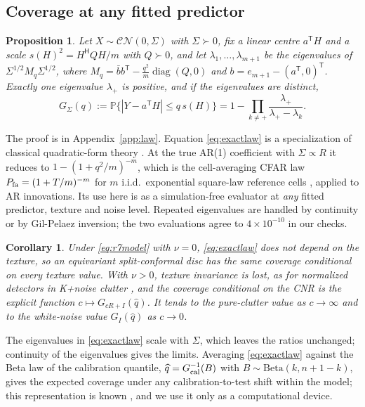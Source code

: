 \documentclass[journal]{IEEEtran}
\newtheorem{proposition}{Proposition}
\newtheorem{corollary}{Corollary}
\newcommand{\PP}{\mathbb{P}}
\begin{document}
\subsection{Coverage at any fitted predictor}
\begin{proposition}\label{prop:law}
Let $X\sim\mathcal{CN}(0,\Sigma)$ with $\Sigma\succ0$, fix a linear centre $a^{\mathsf T}H$ and a scale $s(H)^2=H^{\mathsf H}QH/m$ with $Q\succ0$, and let $\lambda_1,\dots,\lambda_{m+1}$ be the eigenvalues of $\Sigma^{1/2}M_q\Sigma^{1/2}$, where $M_q=\bar bb^{\mathsf T}-\frac{q^2}{m}\operatorname{diag}(Q,0)$ and $b=e_{m+1}-(a^{\mathsf T},0)^{\mathsf T}$. Exactly one eigenvalue $\lambda_+$ is positive, and if the eigenvalues are distinct,
\begin{equation}
G_\Sigma(q):=\PP\{|Y-a^{\mathsf T}H|\le q\,s(H)\}=1-\prod_{k\ne+}\frac{\lambda_+}{\lambda_+-\lambda_k}.
\label{eq:exactlaw}
\end{equation}
\end{proposition}
The proof is in Appendix~\ref{app:law}. Equation \eqref{eq:exactlaw} is a specialization of classical quadratic-form theory \cite{imhof1961,alnaffouri2016}. At the true AR(1) coefficient with $\Sigma\propto R$ it reduces to $1-(1+q^2/m)^{-m}$, which is the cell-averaging CFAR law $P_{\rm fa}=(1+T/m)^{-m}$ for $m$ i.i.d.\ exponential square-law reference cells \cite{finn1968,gandhi1988}, applied to AR innovations. Its use here is as a simulation-free evaluator at \emph{any} fitted predictor, texture and noise level. Repeated eigenvalues are handled by continuity or by Gil-Pelaez inversion; the two evaluations agree to $4\times10^{-10}$ in our checks.

\begin{corollary}\label{cor:texture}
Under \eqref{eq:r7model} with $\nu=0$, \eqref{eq:exactlaw} does not depend on the texture, so an equivariant split-conformal disc has the same coverage conditional on every texture value. With $\nu>0$, texture invariance is lost, as for normalized detectors in K+noise clutter \cite{gini1997,watts1987,sangston2012}, and the coverage conditional on the CNR is the explicit function $c\mapsto G_{cR+I}(\widehat q)$. It tends to the pure-clutter value as $c\to\infty$ and to the white-noise value $G_I(\widehat q)$ as $c\to0$.
\end{corollary}
The eigenvalues in \eqref{eq:exactlaw} scale with $\Sigma$, which leaves the ratios unchanged; continuity of the eigenvalues gives the limits. Averaging \eqref{eq:exactlaw} against the Beta law of the calibration quantile, $\widehat q=G_{\rm cal}^{-1}(B)$ with $B\sim\mathrm{Beta}(k,n+1-k)$, gives the expected coverage under any calibration-to-test shift within the model; this representation is known \cite{vovk2012,ramos2026}, and we use it only as a computational device.
\end{document}
